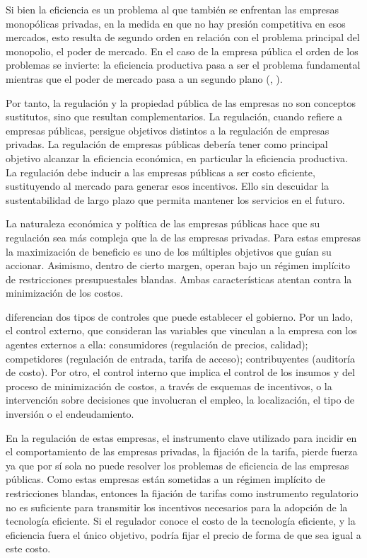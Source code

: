 \documentclass[
  12pt,
  spanish,
]{book}
\begin{document}
Si bien la eficiencia es un problema al que también se enfrentan las
empresas monopólicas privadas, en la medida en que no hay presión
competitiva en esos mercados, esto resulta de segundo orden en relación
con el problema principal del monopolio, el poder de mercado. En el caso
de la empresa pública el orden de los problemas se invierte: la
eficiencia productiva pasa a ser el problema fundamental mientras que el
poder de mercado pasa a un segundo plano (\citet{Roland2000},
\citet{WorldBank1995}).

Por tanto, la regulación y la propiedad pública de las empresas no son
conceptos sustitutos, sino que resultan complementarios. La regulación,
cuando refiere a empresas públicas, persigue objetivos distintos a la
regulación de empresas privadas. La regulación de empresas públicas
debería tener como principal objetivo alcanzar la eficiencia económica,
en particular la eficiencia productiva. La regulación debe inducir a las
empresas públicas a ser costo eficiente, sustituyendo al mercado para
generar esos incentivos. Ello sin descuidar la sustentabilidad de largo
plazo que permita mantener los servicios en el futuro.

La naturaleza económica y política de las empresas públicas hace que su
regulación sea más compleja que la de las empresas privadas. Para estas
empresas la maximización de beneficio es uno de los múltiples objetivos
que guían su accionar. Asimismo, dentro de cierto margen, operan bajo un
régimen implícito de restricciones presupuestales blandas. Ambas
características atentan contra la minimización de los costos.

\citet{Laffont1993} diferencian dos tipos de controles que puede
establecer el gobierno. Por un lado, el control externo, que consideran
las variables que vinculan a la empresa con los agentes externos a ella:
consumidores (regulación de precios, calidad); competidores (regulación
de entrada, tarifa de acceso); contribuyentes (auditoría de costo). Por
otro, el control interno que implica el control de los insumos y del
proceso de minimización de costos, a través de esquemas de incentivos, o
la intervención sobre decisiones que involucran el empleo, la
localización, el tipo de inversión o el endeudamiento.

En la regulación de estas empresas, el instrumento clave utilizado para
incidir en el comportamiento de las empresas privadas, la fijación de la
tarifa, pierde fuerza ya que por sí sola no puede resolver los problemas
de eficiencia de las empresas públicas. Como estas empresas están
sometidas a un régimen implícito de restricciones blandas, entonces la
fijación de tarifas como instrumento regulatorio no es suficiente para
transmitir los incentivos necesarios para la adopción de la tecnología
eficiente. Si el regulador conoce el costo de la tecnología eficiente, y
la eficiencia fuera el único objetivo, podría fijar el precio de forma
de que sea igual a este costo.
\end{document}
